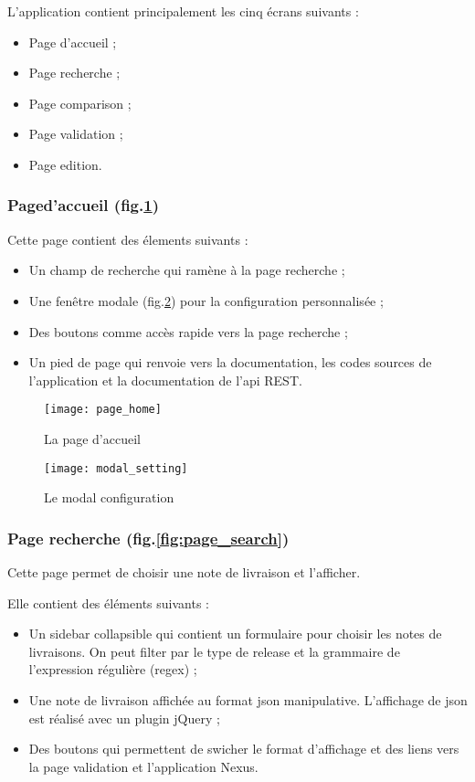 L'application contient principalement les cinq écrans suivants :
\begin{itemize}
 \item Page d'accueil ;
 \item Page recherche ;
 \item Page comparison ;
 \item Page validation ;
 \item Page edition.
\end{itemize}

\subsubsection{Paged'accueil (fig.\ref{fig:page_home})}
Cette page contient des élements suivants :
\begin{itemize}
 \item Un champ de recherche qui ramène à la page recherche ;
 \item Une fenêtre modale (fig.\ref{fig:modal_setting}) pour la configuration personnalisée ;
 \item Des boutons comme accès rapide vers la page recherche ;
 \item Un pied de page qui renvoie vers la documentation, les codes sources de l'application et la documentation de l'api REST.
\end{itemize}

\begin{figure}[ht]
 \centering
 \texttt{[image: page\_home]}
 \caption{La page d'accueil}
 \label{fig:page_home}
\end{figure}

\begin{figure}[ht]
 \centering
 \texttt{[image: modal\_setting]}
 \caption{Le modal configuration}
 \label{fig:modal_setting}
\end{figure}

\subsubsection{Page recherche (fig.\ref{fig:page_search})}
Cette page permet de choisir une note de livraison et l'afficher.

Elle contient des éléments suivants :
\begin{itemize}
 \item Un sidebar collapsible qui contient un formulaire pour choisir les notes de livraisons.
       On peut filter par le type de release et la grammaire de l'expression régulière (regex) ;
 \item Une note de livraison affichée au format json manipulative.
       L'affichage de json est réalisé avec un plugin jQuery ;
 \item Des boutons qui permettent de swicher le format d'affichage et des liens vers la page validation et l'application Nexus.
\end{itemize}

